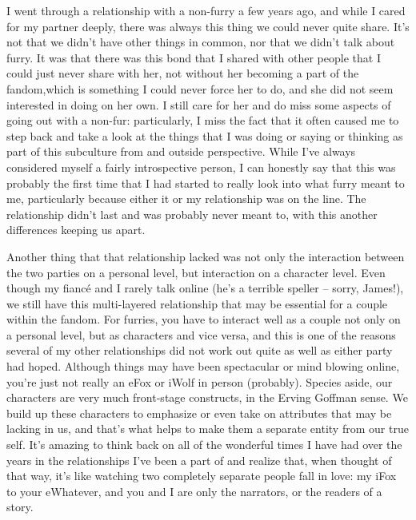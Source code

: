 I went through a relationship with a non-furry a few years ago, and while I cared for my partner deeply, there was always this thing we could never quite share. It's not that we didn't have other things in common, nor that we didn't talk about furry. It was that there was this bond that I shared with other people that I could just never share with her, not without her becoming a part of the fandom,which is something I could never force her to do, and she did not seem interested in doing on her own. I still care for her and do miss some aspects of going out with a non-fur: particularly, I miss the fact that it often caused me to step back and take a look at the things that I was doing or saying or thinking as part of this subculture from and outside perspective. While I've always considered myself a fairly introspective person, I can honestly say that this was probably the first time that I had started to really look into what furry meant to me, particularly because either it or my relationship was on the line. The relationship didn't last and was probably never meant to, with this another differences keeping us apart.

Another thing that that relationship lacked was not only the interaction between the two parties on a personal level, but interaction on a character level. Even though my fiancé and I rarely talk online (he's a terrible speller -- sorry, James!), we still have this multi-layered relationship that may be essential for a couple within the fandom. For furries, you have to interact well as a couple not only on a personal level, but as characters and vice versa, and this is one of the reasons several of my other relationships did not work out quite as well as either party had hoped. Although things may have been spectacular or mind blowing online, you're just not really an eFox or iWolf in person (probably). Species aside, our characters are very much front-stage constructs, in the Erving Goffman sense. We build up these characters to emphasize or even take on attributes that may be lacking in us, and that's what helps to make them a separate entity from our true self. It's amazing to think back on all of the wonderful times I have had over the years in the relationships I've been a part of and realize that, when thought of that way, it's like watching two completely separate people fall in love: my iFox to your eWhatever, and you and I are only the narrators, or the readers of a story.

